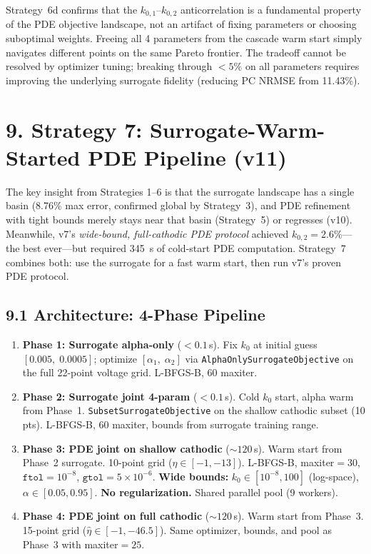 \documentclass[11pt]{article}
\begin{document}
Strategy~6d confirms that the $k_{0,1}$--$k_{0,2}$ anticorrelation is a
fundamental property of the PDE objective landscape, not an artifact of
fixing parameters or choosing suboptimal weights.  Freeing all 4 parameters
from the cascade warm start simply navigates different points on the same
Pareto frontier.  The tradeoff cannot be resolved by optimizer tuning;
breaking through $< 5\%$ on all parameters requires improving the
underlying surrogate fidelity (reducing PC NRMSE from 11.43\%).


\section*{9. Strategy 7: Surrogate-Warm-Started PDE Pipeline (v11)}\label{sec:strat7}

The key insight from Strategies 1--6 is that the surrogate landscape has a
single basin (8.76\% max error, confirmed global by Strategy~3), and PDE
refinement with tight bounds merely stays near that basin (Strategy~5) or
regresses (v10).  Meanwhile, v7's \emph{wide-bound, full-cathodic PDE protocol}
achieved $k_{0,2} = 2.6\%$---the best ever---but required \SI{345}{s} of
cold-start PDE computation.  Strategy~7 combines both: use the surrogate for a
fast warm start, then run v7's proven PDE protocol.

\subsection*{9.1 Architecture: 4-Phase Pipeline}

\begin{enumerate}
  \item \textbf{Phase 1: Surrogate alpha-only} ($< 0.1$\,s).
        Fix $k_0$ at initial guess $[0.005,\; 0.0005]$; optimize
        $[\alpha_1,\; \alpha_2]$ via \texttt{AlphaOnlySurrogateObjective}
        on the full 22-point voltage grid.  L-BFGS-B, 60 maxiter.

  \item \textbf{Phase 2: Surrogate joint 4-param} ($< 0.1$\,s).
        Cold $k_0$ start, alpha warm from Phase~1.
        \texttt{SubsetSurrogateObjective} on the shallow cathodic subset
        (10 pts).  L-BFGS-B, 60 maxiter, bounds from surrogate training range.

  \item \textbf{Phase 3: PDE joint on shallow cathodic} (${\sim}120$\,s).
        Warm start from Phase~2 surrogate.  10-point grid
        ($\hat\eta \in [-1, -13]$).  L-BFGS-B, maxiter${}=30$,
        $\texttt{ftol} = 10^{-8}$, $\texttt{gtol} = 5 \times 10^{-6}$.
        \textbf{Wide bounds:} $k_0 \in [10^{-8}, 100]$ (log-space),
        $\alpha \in [0.05, 0.95]$.  \textbf{No regularization.}
        Shared parallel pool (9 workers).

  \item \textbf{Phase 4: PDE joint on full cathodic} (${\sim}120$\,s).
        Warm start from Phase~3.  15-point grid
        ($\hat\eta \in [-1, -46.5]$).  Same optimizer, bounds, and pool as Phase~3
        with maxiter${}=25$.
\end{enumerate}
\end{document}

